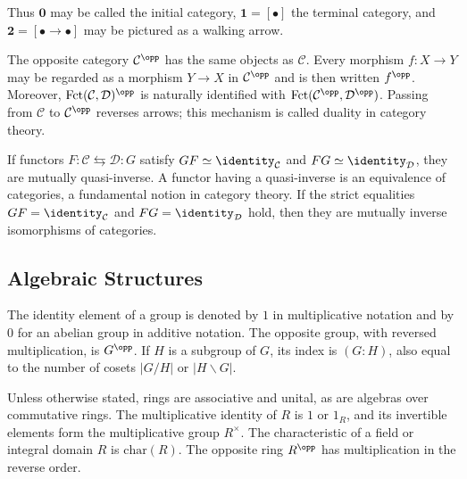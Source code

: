 Thus $\mathbf0$ may be called the initial category, $\mathbf1=[\bullet]$ the terminal category, and $\mathbf2=[\bullet\to\bullet]$ may be pictured as a walking arrow.

The opposite category $\mathcal C^{\opp}$ has the same objects as $\mathcal C$. Every morphism $f:X\to Y$ may be regarded as a morphism $Y\to X$ in $\mathcal C^{\opp}$ and is then written $f^{\opp}$. Moreover, $\mathrm{Fct}(\mathcal C,\mathcal D)^{\opp}$ is naturally identified with $\mathrm{Fct}(\mathcal C^{\opp},\mathcal D^{\opp})$. Passing from $\mathcal C$ to $\mathcal C^{\opp}$ reverses arrows; this mechanism is called duality in category theory.

If functors $F:\mathcal C\leftrightarrows\mathcal D:G$ satisfy $GF\simeq\identity_{\mathcal C}$ and $FG\simeq\identity_{\mathcal D}$, they are mutually quasi-inverse. A functor having a quasi-inverse is an equivalence of categories, a fundamental notion in category theory. If the strict equalities $GF=\identity_{\mathcal C}$ and $FG=\identity_{\mathcal D}$ hold, then they are mutually inverse isomorphisms of categories.

\subsection*{Algebraic Structures}

The identity element of a group is denoted by $1$ in multiplicative notation and by $0$ for an abelian group in additive notation. The opposite group, with reversed multiplication, is $G^{\opp}$. If $H$ is a subgroup of $G$, its index is $(G:H)$, also equal to the number of cosets $|G/H|$ or $|H\backslash G|$.

Unless otherwise stated, rings are associative and unital, as are algebras over commutative rings. The multiplicative identity of $R$ is $1$ or $1_R$, and its invertible elements form the multiplicative group $R^\times$. The characteristic of a field or integral domain $R$ is $\mathrm{char}(R)$. The opposite ring $R^{\opp}$ has multiplication in the reverse order.

